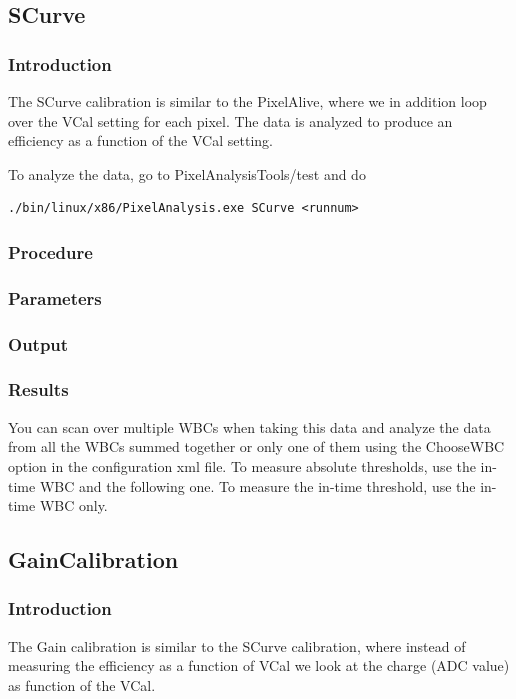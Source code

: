 \subsection{SCurve}
\label{sec:SCurveCalibration}

\subsubsection{Introduction}
The SCurve calibration is similar to the PixelAlive, where we in addition loop over the VCal setting for each pixel. The data is analyzed to produce an efficiency as a function of the VCal setting.

To analyze the data, go to PixelAnalysisTools/test and do

\begin{verbatim}
./bin/linux/x86/PixelAnalysis.exe SCurve <runnum>
\end{verbatim}

\subsubsection{Procedure}
\subsubsection{Parameters}
\subsubsection{Output}
\subsubsection{Results}

You can scan over multiple WBCs when taking this data and analyze the data from all the WBCs summed together or only one of them using the ChooseWBC option in the configuration xml file. To measure absolute thresholds, use the in-time WBC and the following one.  To measure the in-time threshold, use the in-time WBC only.

\subsection{GainCalibration}
\label{sec:GainCalibration}

\subsubsection{Introduction}
The Gain calibration is similar to the SCurve calibration, where instead of measuring the efficiency as a function of VCal we look at the charge (ADC value) as function of the VCal.

